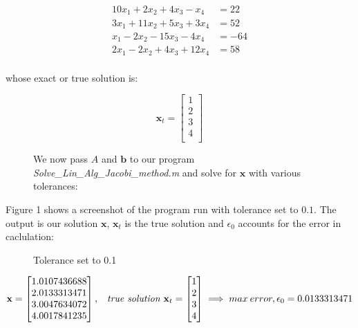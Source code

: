 \documentclass[main]{subfiles}
\begin{document}
\begin{align}
    10 x_1 + 2 x_2 + 4 x_3     -  x_4  &= 22        \\
    3  x_1 + 11 x_2  + 5  x_3  + 3  x_4 &= 52   \\
      x_1 - 2 x_2   - 15 x_3  - 4  x_4 &= -64   \\
    2  x_1 - 2 x_2   + 4  x_3  + 12 x_4 &= 58
\end{align}
\\
whose exact or true solution is:

\[
    \textbf{x}_t = \begin{bmatrix}
        1 \\
        2 \\
        3 \\
        4 \\
    \end{bmatrix}
\]

\clearpage



     


    \begin{figure}[t!]
    We now pass $A$ and $\textbf{b}$ to our program \textit{Solve\_Lin\_Alg\_Jacobi\_method.m}
    and solve for $\textbf{x}$ with various tolerances:
    \vspace{2mm}
    \end{figure}


    Figure 1 shows a screenshot of the program run with tolerance set to $0.1$. 
    The output is our solution $\textbf{x}$, $\textbf{x}_t$ is the true solution 
    and $\epsilon_0$ accounts for the error in caclulation:
    
    \begin{figure}
        \caption{Tolerance set to 0.1}\label{fig:key}
    \end{figure}
    
    \begin{equation*}
        \textbf{x} = \begin{bmatrix}
            1.0107436688\\
            2.0133313471\\
            3.0047634072\\
            4.0017841235\\
        \end{bmatrix},
        \hspace{3mm}\textit{true solution }\textbf{x}_t = \begin{bmatrix}
            1\\
            2\\
            3\\
            4
        \end{bmatrix}
        \implies max\:error, \epsilon_0 = 0.0133313471
    \end{equation*}
    
\end{document}
